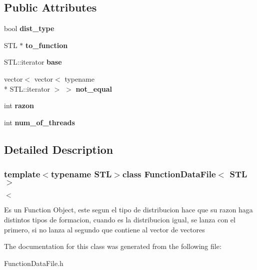 \subsection*{Public Attributes}
\begin{DoxyCompactItemize}
\item 
\hypertarget{class_function_data_file_addccefdce024d118efc51168e8972411}{bool {\bfseries dist\-\_\-type}}\label{class_function_data_file_addccefdce024d118efc51168e8972411}

\item 
\hypertarget{class_function_data_file_a8d8f5397f0f627b7f8ab697d42e70771}{S\-T\-L $\ast$ {\bfseries to\-\_\-function}}\label{class_function_data_file_a8d8f5397f0f627b7f8ab697d42e70771}

\item 
\hypertarget{class_function_data_file_a058f87473907c781dea4a2cac32a11a5}{S\-T\-L\-::iterator {\bfseries base}}\label{class_function_data_file_a058f87473907c781dea4a2cac32a11a5}

\item 
\hypertarget{class_function_data_file_aae1c27aaa0381cafe0550b556b549ce1}{vector$<$ vector$<$ typename \\*
S\-T\-L\-::iterator $>$ $>$ {\bfseries not\-\_\-equal}}\label{class_function_data_file_aae1c27aaa0381cafe0550b556b549ce1}

\item 
\hypertarget{class_function_data_file_a48a76876437b37c79c3551fde5c8453c}{int {\bfseries razon}}\label{class_function_data_file_a48a76876437b37c79c3551fde5c8453c}

\item 
\hypertarget{class_function_data_file_a451999da84fb3bad22b4ef6735a51ba3}{int {\bfseries num\-\_\-of\-\_\-threads}}\label{class_function_data_file_a451999da84fb3bad22b4ef6735a51ba3}

\end{DoxyCompactItemize}


\subsection{Detailed Description}
\subsubsection*{template$<$typename S\-T\-L$>$class Function\-Data\-File$<$ S\-T\-L $>$}

$<$

Es un Function Object, este segun el tipo de distribucion hace que su razon haga distintos tipos de formacion, cuando es la distribucion igual, se lanza con el primero, si no lanza al segundo que contiene al vector de vectores 

The documentation for this class was generated from the following file\-:\begin{DoxyCompactItemize}
\item 
Function\-Data\-File.\-h\end{DoxyCompactItemize}
